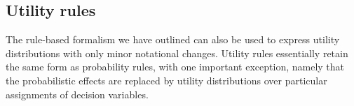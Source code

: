
\subsection{Utility rules}

The rule-based formalism we have outlined can also be used to express utility distributions with only minor notational changes. Utility rules essentially retain the same form as probability rules, with one important exception, namely that the probabilistic effects are replaced by utility distributions over particular assignments of decision variables. 

